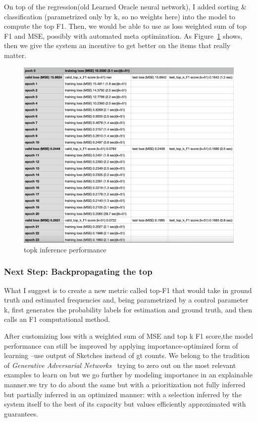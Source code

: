 

On top of the regression(old Learned Oracle neural network), I added sorting \& classification  (parametrized only by k, so no weights here) into the model to compute the top F1. Then, we would be able to use as loss weighted sum of top F1 and MSE, possibly with automated meta optimization. As Figure~\ref{fig:topk_performance} shows, then we give the system an incentive to get better  on the items that really matter.

\begin{figure}[htbp!]
	\centering
	\includegraphics[width=0.5\linewidth]{images/plots/topk_inference_perf_v1_log.png}
	\caption{topk inference performance}
	\label{fig:topk_performance}
\end{figure}

\subsubsection{Next Step: Backpropagating the top}

What I suggest is to create a new metric called top-F1 that would take in ground truth and estimated frequencies and, being parametrized by a control parameter k, first generates the probability labels for estimation and ground truth, and then calls an F1 computational method.

After customizing loss with a weighted sum of MSE and top k F1 score,the model performance can still be improved by applying importance-optimized form of learning --use output of Sketches instead of gt counts. We belong to the tradition of \emph{Generative Adversarial Networks}~\cite{goodfellow2014generative} trying to zero out on the most relevant examples to learn on but we go further by modeling importance in an explainable manner.we try to do about the same but with a prioritization not fully inferred but partially inferred in an optimized manner: with a selection inferred by the system itself to the best of its capacity but values efficiently approximated with guarantees.

